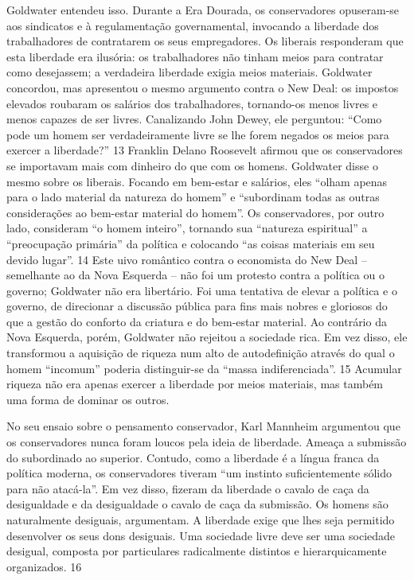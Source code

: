  
\par
 
Goldwater entendeu isso. Durante a Era Dourada, os conservadores opuseram-se aos sindicatos e à regulamentação governamental, invocando a liberdade dos trabalhadores de contratarem os seus empregadores. Os liberais responderam que esta liberdade era ilusória: os trabalhadores não tinham meios para contratar como desejassem; a verdadeira liberdade exigia meios materiais. Goldwater concordou, mas apresentou o mesmo argumento contra o New Deal: os impostos elevados roubaram os salários dos trabalhadores, tornando-os menos livres e menos capazes de ser livres. Canalizando John Dewey, ele perguntou: “Como pode um homem ser verdadeiramente livre se lhe forem negados os meios para exercer a liberdade?”
 {\color{blue} 13}  
Franklin Delano Roosevelt afirmou que os conservadores se importavam mais com dinheiro do que com os homens. Goldwater disse o mesmo sobre os liberais. Focando em bem-estar e salários, eles “olham apenas para o lado material da natureza do homem” e “subordinam todas as outras considerações ao bem-estar material do homem”. Os conservadores, por outro lado, consideram “o homem inteiro”, tornando sua “natureza espiritual” a “preocupação primária” da política e colocando “as coisas materiais em seu devido lugar”.
 {\color{blue} 14}  
Este uivo romântico contra o economista do New Deal – semelhante ao da Nova Esquerda – não foi um protesto contra a política ou o governo; Goldwater não era libertário. Foi uma tentativa de elevar a política e o governo, de direcionar a discussão pública para fins mais nobres e gloriosos do que a gestão do conforto da criatura e do bem-estar material. Ao contrário da Nova Esquerda, porém, Goldwater não rejeitou a sociedade rica. Em vez disso, ele transformou a aquisição de riqueza num alto de autodefinição através do qual o homem “incomum” poderia distinguir-se da “massa indiferenciada”.
 {\color{blue} 15}  
Acumular riqueza não era apenas exercer a liberdade por meios materiais, mas também uma forma de dominar os outros.
 
\par
 
No seu ensaio sobre o pensamento conservador, Karl Mannheim argumentou que os conservadores nunca foram loucos pela ideia de liberdade. Ameaça a submissão do subordinado ao superior. Contudo, como a liberdade é a língua franca da política moderna, os conservadores tiveram “um instinto suficientemente sólido para não atacá-la”. Em vez disso, fizeram da liberdade o cavalo de caça da desigualdade e da desigualdade o cavalo de caça da submissão. Os homens são naturalmente desiguais, argumentam. A liberdade exige que lhes seja permitido desenvolver os seus dons desiguais. Uma sociedade livre deve ser uma sociedade desigual, composta por particulares radicalmente distintos e hierarquicamente organizados.
 {\color{blue} 16}  

